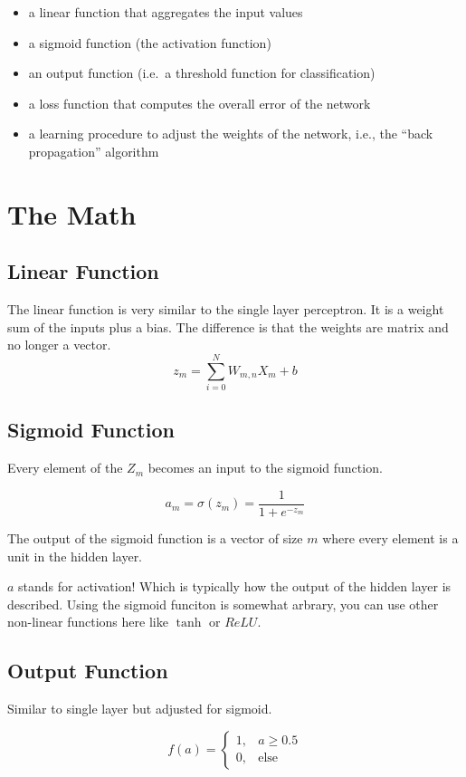 \documentclass[letterpaper,12pt]{article}
\begin{document}
\begin{itemize}
    \item a linear function that aggregates the input values
    \item a sigmoid function (the activation function)
    \item an output function (i.e.\ a threshold function for classification)
    \item a loss function that computes the overall error of the network
    \item a learning procedure to adjust the weights of the network, i.e., the
        ``back propagation'' algorithm
\end{itemize}

\section{The Math}

\subsection{Linear Function}
The linear function is very similar to the single layer perceptron. It is a
weight sum of the inputs plus a bias. The difference is that the weights are
matrix and no longer a vector.
\[
    z_m = \sum_{i=0}^{N} W_{m,n} X_m + b
\]

\subsection{Sigmoid Function}
Every element of the $Z_m$ becomes an input to the sigmoid function.

\[
    a_m = \sigma(z_m) = \frac{1}{1 + e^{-z_m}}
\]

The output of the sigmoid function is a vector of size $m$ where every element
is a unit in the hidden layer.

$a$ stands for activation! Which is typically how the output of the hidden layer
is described. Using the sigmoid funciton is somewhat arbrary, you can use other
non-linear functions here like $\tanh$ or $ReLU$.

\subsection{Output Function}

Similar to single layer but adjusted for sigmoid.

\[
    f(a) =
    \begin{cases}
        1, & a \ge 0.5\\
        0, & \text{else}
    \end{cases}
\]
\end{document}
